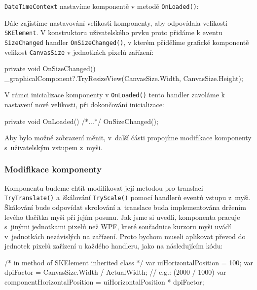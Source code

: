 \texttt{DateTimeContext} nastavíme komponentě v metodě \texttt{OnLoaded()}:

\begin{csharpcode}
private void OnLoaded() {
	_graphicalComponent
	.TryChangeDateTimeContext(TrainTimetableData.DateTimeContext);
\end{csharpcode}

Dále zajistíme nastavování velikosti komponenty, aby odpovídala velikosti \texttt{SKElement}. V konstruktoru uživatelského prvku proto přidáme k eventu \linebreak\texttt{SizeChanged} handler \texttt{OnSizeChanged()}, v kterém přidělíme grafické komponentě velikost \texttt{CanvasSize} v jednotkách pixelů zařízení: 

\begin{csharpcode}
private void OnSizeChanged() {
    _graphicalComponent?.TryResizeView(CanvasSize.Width, CanvasSize.Height);
}
\end{csharpcode}

V rámci inicializace komponenty v \texttt{OnLoaded()} tento handler zavoláme k nastavení nové velikosti, při dokončování inicializace:

\begin{csharpcode}
private void OnLoaded() {
	/*...*/
	OnSizeChanged();
}
\end{csharpcode}

Aby bylo možné zobrazení měnit, v~další části propojíme modifikace komponenty s~uživatelským vstupem z~myši.

\subsubsection*{Modifikace komponenty}
Komponentu budeme chtít modifikovat její metodou pro translaci \linebreak\texttt{TryTranslate()} a~škálování \texttt{TryScale()} pomocí handlerů eventů vstupu z~myši. Škálování bude odpovídat skrolování a~translace buda implementována držením levého tlačítka myši při jejím posunu. Jak jsme si uvedli, komponenta pracuje s~jinými jednotkami pixelů než WPF, které souřadnice kurzoru myši uvádí v~jednotkách nezávislých na zařízení. Proto bychom museli aplikovat převod do jednotek pixelů zařízení u každého handleru, jako na následujícím kódu:

\begin{csharpcode}
  /* in method of SKElement inherited class */
  var uiHorizontalPosition = 100;
  var dpiFactor = CanvasSize.Width / ActualWidth; // e.g.: (2000 / 1000)
  var componentHorizontalPosition = uiHorizontalPosition * dpiFactor;
\end{csharpcode}

